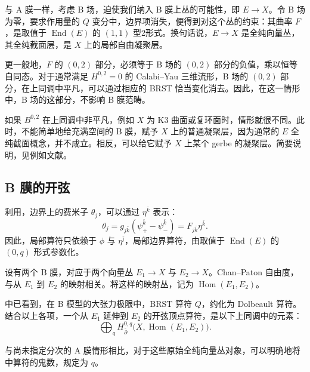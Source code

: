 与 A 膜一样，考虑 B 场，迫使我们纳入 B 膜上丛的可能性，即 $E\to X$。令 B 场为零，要求作用量的 $Q$ 变分中，边界项消失，便得到对这个丛的约束：其曲率 $F$，是取值于 $\operatorname{End}(E)$ 的 $(1,1)$ 型2形式。换句话说，$E\to X$ 是全纯向量丛，其全纯截面层，是 $X$ 上的局部自由凝聚层。

更一般地，$F$ 的 $(0,2)$ 部分，必须等于 B 场的 $(0,2)$ 部分的负值，乘以恒等自同态。对于通常满足 $H^{0,2}=0$ 的 Calabi--Yau 三维流形，B 场的 $(0,2)$ 部分，在上同调中平凡，可以通过相应的 BRST 恰当变化消去。因此，在这一情形中，B 场的这部分，不影响 B 膜范畴。

如果 $B^{0,2}$ 在上同调中非平凡，例如 $X$ 为 K3 曲面或复环面时，情形就很不同。此时，不能简单地给充满空间的 B 膜，赋予 $X$ 上的普通凝聚层，因为通常的 $E$ 全纯截面概念，并不成立。相反，可以给它赋予 $X$ 上某个 gerbe 的凝聚层。简要说明，见例如文献。

\subsection{B 膜的开弦}\label{sec:3.6.4}

利用，边界上的费米子 $\theta_j$，可以通过 $\eta^{\bar k}$ 表示：
\begin{equation}\label{eq:3.190}
\theta_j=g_{j\bar k}
\left(\psi_+^{\bar k}-\psi_-^{\bar k}\right)
=F_{j\bar k}\eta^{\bar k}.
\end{equation}
因此，局部算符只依赖于 $\phi$ 与 $\eta^{\bar\jmath}$，局部边界算符，由取值于 $\operatorname{End}(E)$ 的 $(0,q)$ 形式参数化。

设有两个 B 膜，对应于两个向量丛 $E_1\to X$ 与 $E_2\to X$。Chan--Paton 自由度，与从 $E_1$ 到 $E_2$ 的映射相关。将这样的映射丛，记为 $\operatorname{Hom}(E_1,E_2)$。

中已看到，在 B 模型的大张力极限中，BRST 算符 $Q$，约化为 Dolbeault 算符。结合以上各项，一个从 $E_1$ 延伸到 $E_2$ 的开弦顶点算符，是以下上同调中的元素：
\begin{equation}\label{eq:3.191}
\bigoplus_qH^{0,q}_{\bar\partial}
\bigl(X,\operatorname{Hom}(E_1,E_2)\bigr).
\end{equation}

与尚未指定分次的 A 膜情形相比，对于这些原始全纯向量丛对象，可以明确地将中算符的鬼数，规定为 $q$。

